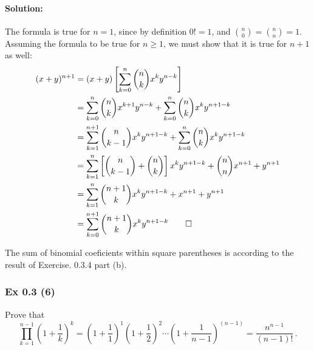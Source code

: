 {\paragraph{Solution:}{
The formula is true for $n = 1$, since by definition $0! = 1$, and $\binom{n}{0} = \binom{n}{n} = 1$. 
Assuming the formula to be true for $n \geq 1$, we must show that it is true for $n+1$ as well: 
\begin{align*}
(x + y)^{n+1} &= (x + y) \left[ \sum_{k=0}^n \binom{n}{k} x^k y ^{n-k}   \right]\\
              &= \sum_{k=0}^n \binom{n}{k} x^{k+1} y^{n-k} + \sum_{k=0}^n \binom{n}{k} x^k y ^{n+1-k}\\
              &= \sum_{k=1}^{n+1} \binom{n}{k-1} x^{k} y^{n+1-k} + \sum_{k=0}^n \binom{n}{k} x^k y ^{n+1-k}\\ 
              &= \sum_{k=1}^{n} \left[ \binom{n}{k-1} +  \binom{n}{k} \right] x^{k} y^{n+1-k} + \binom{n}{n} x^{n+1} + y^{n+1}\\
              &= \sum_{k=1}^{n} \binom{n+1}{k}  x^{k} y^{n+1-k}  + x^{n+1} + y^{n+1}\\
              &= \sum_{k=0}^{n+1} \binom{n+1}{k}  x^{k} y^{n+1-k} \qed
\end{align*}

The sum of binomial coeficients within square parentheses  is  according to the result of Exercise. 0.3.4 part (b).  

\subsubsection{Ex 0.3 (6)}\label{sec:Ex_0.3.6}
Prove that 
$$\prod_{k=1}^{n-1} \left(1 + \frac{1}{k} \right)^k  = \left(1 + \frac{1}{1} \right)^1 \left(1 + \frac{1}{2} \right)^2 \cdots \left(1 + \frac{1}{n - 1} \right)^{(n-1)} = \frac{n^{n-1}}{(n-1)!}\,.$$
%
%
}}
